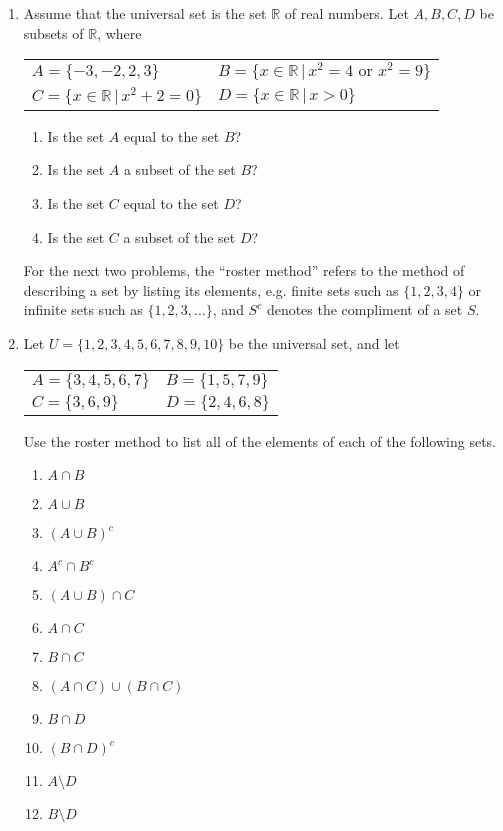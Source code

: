 \documentclass[letterpaper,12pt]{article}
\newcommand{\R}{\mathbb{R}}
\begin{document}
\begin{enumerate}
\item Assume that the universal set is the set $\R$ of real numbers. Let $A,B,C,D$ be subsets of $\R$, where
\begin{center}
\begin{tabular}{ll}
$A = \{-3,-2,2,3\}$ & $B = \{x\in\R \,|\, x^2=4 \text{ or } x^2=9\}$\\
$C = \{x\in \R\,|\, x^2+2=0\}$ & $D = \{x\in\R\,|\, x>0\}$
\end{tabular}
\end{center}
\begin{enumerate}
\item Is the set $A$ equal to the set $B$?
\item Is the set $A$ a subset of the set $B$?
\item Is the set $C$ equal to the set $D$?
\item Is the set $C$ a subset of the set $D$?
\end{enumerate}
For the next two problems, the ``roster method'' refers to the method of describing a set by listing its elements, e.g. finite sets such as $\{1,2,3,4\}$ or infinite sets such as $\{1,2,3,\ldots\}$, and $S^c$ denotes the compliment of a set $S$.
\item Let $U=\{1,2,3,4,5,6,7,8,9,10\}$ be the universal set, and let
\begin{center}
\begin{tabular}{ll}
$A=\{3,4,5,6,7\}$ & $B=\{1,5,7,9\}$\\
$C = \{3,6,9\}$ & $D=\{2,4,6,8\}$
\end{tabular}
\end{center}
Use the roster method to list all of the elements of each of the following sets.
\begin{multicols}{2}
\begin{enumerate}
\item $A\cap B$
\item $A\cup B$
\item $(A\cup B)^c$
\item $A^c\cap B^c$
\item $(A\cup B)\cap C$
\item $A\cap C$
\item $B\cap C$
\item $(A\cap C)\cup (B\cap C)$
\item $B\cap D$
\item $(B\cap D)^c$
\item $A\setminus D$
\item $B\setminus D$

\end{enumerate}
\end{multicols}
\end{enumerate}
\end{document}
